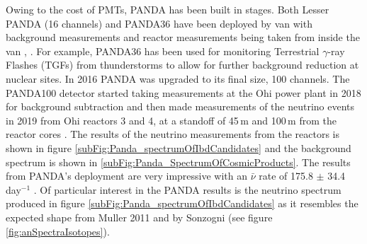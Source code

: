 Owing to the cost of PMTs, PANDA has been built in stages.  Both Lesser PANDA (16 channels) and PANDA36 have been deployed by van with background measurements and reactor measurements being taken from inside the van \cite{PANDA_2012}, \cite{PANDA_2014}. For example, PANDA36 has been used for monitoring Terrestrial $\gamma$-ray Flashes (TGFs) from thunderstorms to allow for further background reduction at nuclear sites\cite{PANDA_tgf}. In 2016 PANDA was upgraded to its final size, 100 channels. The PANDA100 detector started taking measurements at the Ohi power plant in 2018 for background subtraction and then made measurements of the neutrino events in 2019 from Ohi reactors 3 and 4, at a standoff of 45\,m and 100\,m from the reactor cores \cite{Iwata_2019}. The results of the neutrino measurements from the reactors is shown in figure \ref{subFig:Panda_spectrumOfIbdCandidates} and the background spectrum is shown in \ref{subFig:Panda_SpectrumOfCosmicProducts}. The results from PANDA's deployment are very impressive with an $\bar{\nu}$ rate of 175.8 $\pm$ 34.4 day$^{-1}$ \cite{IIRIE_Panda_2021}. Of particular interest in the PANDA results is the neutrino spectrum produced in figure \ref{subFig:Panda_spectrumOfIbdCandidates} as it resembles the expected shape from Muller 2011 \cite{Mueller_2011} and by Sonzogni \cite{sonzogni_nucStrcutre_2015} (see figure \ref{fig:anSpectraIsotopes}).

